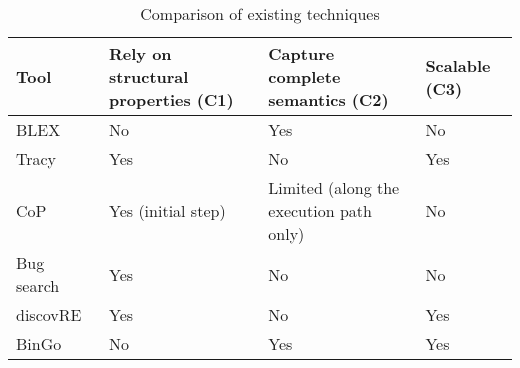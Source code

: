 %
%  
%


\begin{table}[t]
\scriptsize
	\begin{center}
\caption{Comparison of existing techniques} \label{tab:lit_rev}
\begin{tabular}{ | m{1.6cm} | m{1.9cm} | m{1.9cm} | m{0.7cm} | }
\hline
	\textbf{Tool}  & \textbf{Rely on structural properties (C1)} & \textbf{Capture complete semantics (C2)} & \textbf{Scalable (C3)} \\ \hline
	 BLEX~\cite{egele2014blanket} & No &  Yes & No \\ \hline
	 Tracy~\cite{DBLP:conf/pldi/DavidY14}  & Yes & No & Yes \\ \hline
     CoP~\cite{luo2014semantics} & Yes (initial step) & Limited (along the execution path only) & No  \\ \hline
	Bug search~\cite{DBLP:conf/sp/PewnyGGRH15} & Yes & No & No  \\ \hline
	discovRE~\cite{sebastian2016discovre}& Yes & No & Yes  \\ \hline
	 BinGo & No & Yes & Yes \\ \hline
  \end{tabular}
  \end{center} \vspace{-7mm}
\end{table}


